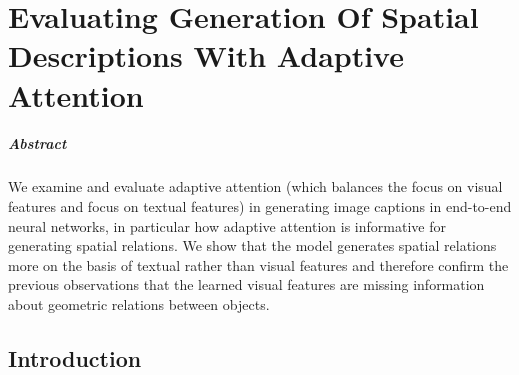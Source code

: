 
\chapter{Evaluating Generation Of Spatial Descriptions With Adaptive Attention}

\paragraph{Abstract}
  We examine and evaluate adaptive attention \cite{lu2017knowing} (which balances the focus on visual features and focus on textual features) in generating image captions in end-to-end neural networks, in particular how adaptive attention is informative for generating spatial relations.
  We show that the model generates spatial relations more on the basis of textual rather than visual features and therefore confirm the previous observations that the learned visual features are missing information about geometric relations between objects.

\section{Introduction}

